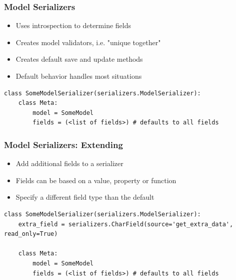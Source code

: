 \documentclass{beamer}
\begin{document}
\begin{frame}[fragile]

  \frametitle{Model Serializers}

\begin{itemize}
	\item Uses introspection to determine fields
	\item Creates model validators, i.e. "unique together"
	\item Creates default save and update methods
	\item Default behavior handles most situations
	
\end{itemize}

\begin{lstlisting}
class SomeModelSerializer(serializers.ModelSerializer):
    class Meta:
        model = SomeModel
        fields = (<list of fields>) # defaults to all fields
\end{lstlisting}

\end{frame}

\begin{frame}[fragile]

  \frametitle{Model Serializers: Extending}

\begin{itemize}
	\item Add additional fields to a serializer
	\item Fields can be based on a value, property or function
	\item Specify a different field type than the default
\end{itemize}

\begin{lstlisting}
class SomeModelSerializer(serializers.ModelSerializer):
    extra_field = serializers.CharField(source='get_extra_data', read_only=True)
    
    class Meta:
        model = SomeModel
        fields = (<list of fields>) # defaults to all fields
\end{lstlisting}

\end{frame}
\end{document}

